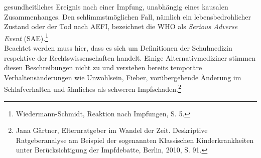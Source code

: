 \documentclass[
    a4paper,
    12pt,
    hyphens,
    chapterprefix=true,
    headheight=33pt,
    footheight=29pt,
    headings=optiontohead,
]{scrartcl}
\begin{document}
gesundheitliches Ereignis nach einer Impfung, unabhängig eines kausalen Zusammenhanges. Den schlimmstmöglichen Fall, nämlich ein lebensbedrohlicher
Zustand oder der Tod nach AEFI, bezeichnet die WHO als \textit{Serious Adverse Event} (SAE).\footnote{Wiedermann-Schmidt, Reaktion nach Impfungen, S. 5.}\\
Beachtet werden muss hier, dass es sich um Definitionen der Schulmedizin respektive der Rechtswissenschaften handelt. Einige Alternativmediziner
stimmen diesen Beschreibungen nicht zu und verstehen bereits temporäre Verhaltensänderungen wie Unwohlsein, Fieber, vorübergehende Änderung im Schlafverhalten und ähnliches als schweren Impfschaden.\footnote{Jana Gärtner, Elternratgeber im Wandel der Zeit.
Deskriptive Ratgeberanalyse am Beispiel der sogenannten Klassischen Kinderkrankheiten unter Berücksichtigung der Impfdebatte, Berlin, 2010, S. 91.}
\end{document}

